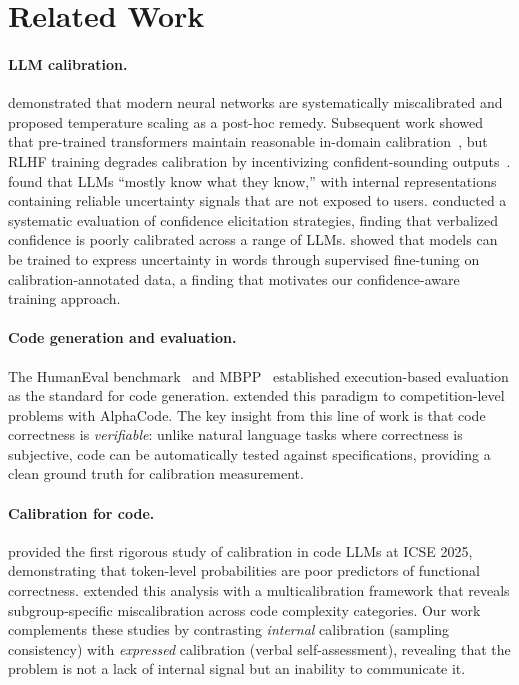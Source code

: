 \documentclass{article}
\begin{document}
\section{Related Work}
\label{sec:related}

\paragraph{LLM calibration.}
\citet{guo2017calibration} demonstrated that modern neural networks are systematically miscalibrated and proposed temperature scaling as a post-hoc remedy. Subsequent work showed that pre-trained transformers maintain reasonable in-domain calibration~\citep{desai2020calibration}, but RLHF training degrades calibration by incentivizing confident-sounding outputs~\citep{tian2023just}. \citet{kadavath2022language} found that LLMs ``mostly know what they know,'' with internal representations containing reliable uncertainty signals that are not exposed to users. \citet{xiong2024can} conducted a systematic evaluation of confidence elicitation strategies, finding that verbalized confidence is poorly calibrated across a range of LLMs. \citet{lin2022teaching} showed that models can be trained to express uncertainty in words through supervised fine-tuning on calibration-annotated data, a finding that motivates our confidence-aware training approach.

\paragraph{Code generation and evaluation.}
The HumanEval benchmark~\citep{chen2021evaluating} and MBPP~\citep{austin2021program} established execution-based evaluation as the standard for code generation. \citet{li2022competition} extended this paradigm to competition-level problems with AlphaCode. The key insight from this line of work is that code correctness is \emph{verifiable}: unlike natural language tasks where correctness is subjective, code can be automatically tested against specifications, providing a clean ground truth for calibration measurement.

\paragraph{Calibration for code.}
\citet{spiess2025calibration} provided the first rigorous study of calibration in code LLMs at ICSE 2025, demonstrating that token-level probabilities are poor predictors of functional correctness. \citet{campos2025multicalibration} extended this analysis with a multicalibration framework that reveals subgroup-specific miscalibration across code complexity categories. Our work complements these studies by contrasting \emph{internal} calibration (sampling consistency) with \emph{expressed} calibration (verbal self-assessment), revealing that the problem is not a lack of internal signal but an inability to communicate it.
\end{document}
